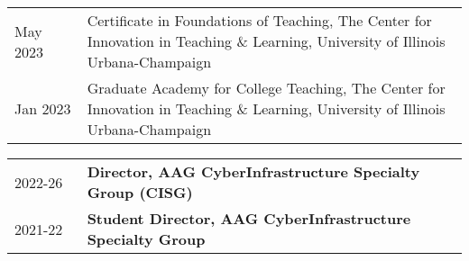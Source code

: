 \documentclass{acmcv}
\begin{document}


    \begin{longtable}{p{0.16\linewidth} p{0.84\linewidth}}
        May 2023 & Certificate in Foundations of Teaching, The Center for Innovation in Teaching \& Learning, University of Illinois Urbana-Champaign \\

        Jan 2023 & Graduate Academy for College Teaching, The Center for Innovation in Teaching \& Learning, University of Illinois Urbana-Champaign \\

    \end{longtable}

    





\vspace*{0.25cm}

    \begin{longtable}{p{0.16\linewidth} p{0.84\linewidth}}

        2022-26 & \textbf{Director, AAG CyberInfrastructure Specialty Group (CISG)} \\

        2021-22 & \textbf{Student Director, AAG CyberInfrastructure Specialty Group}
    \end{longtable}
\end{document}
